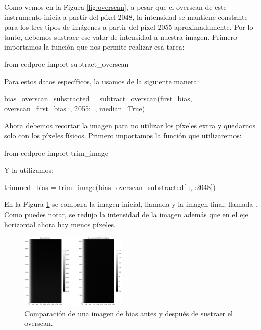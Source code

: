 Como vemos en la Figura \ref{fig:overscan}, a pesar que el overscan de este instrumento inicia a partir del píxel 2048, la intensidad se mantiene constante para los tres tipos de imágenes a partir del píxel 2055 aproximadamente. Por lo tanto, debemos sustraer ese valor de intensidad a nuestra imagen. Primero importamos la función que nos permite realizar esa tarea:

\begin{pyin}
from ccdproc import subtract_overscan
\end{pyin}

Para estos datos específicos, la usamos de la siguiente manera:

\begin{pyin}
bias_overscan_substracted = subtract_overscan(first_bias, 
                                       overscan=first_bias[:, 2055: ],
                                       median=True)
\end{pyin}

Ahora debemos recortar la imagen para no utilizar los píxeles extra y quedarnos solo con los píxeles físicos. Primero importamos la función que utilizaremos:

\begin{pyin}
from ccdproc import trim_image
\end{pyin}

Y la utilizamos: 

\begin{pyin}
trimmed_bias = trim_image(bias_overscan_substracted[ :, :2048])
\end{pyin}

En la Figura \ref{fig:bias_compared} se compara la imagen inicial, llamada  y la imagen final, llamada . Como puedes notar, se redujo la intensidad de la imagen además que en el eje horizontal ahora hay menos píxeles. 

\begin{figure}[htb]
  \centering
	\includegraphics[width=0.45\textwidth]{figures/first_bias.png}
	\caption{Comparación de una imagen de bias antes y después de sustraer el overscan.}
	\label{fig:bias_compared} 
\end{figure}

